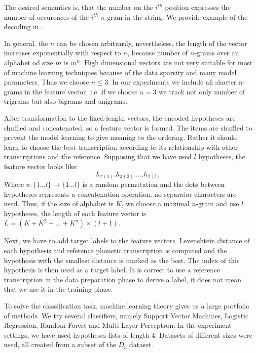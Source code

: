 The desired semantics is, that the number on the $i^{th}$ position expresses the number of occurences of the $i^{th}$ $n$-gram in the string.
We provide example of the decoding in .
\par
In general, the $n$ can be chosen arbitrarily, nevertheless, the length of the vector increases exponentially with respect to $n$, because number of $n$-grams over an alphabet od size $m$ is $m^n$.
High dimensional vectors are not very suitable for most of machine learning techniques because of the data sparsity and many model parameters.
Thus we choose $n \le 3$.
In our experiments we include all shorter n-grams in the feature vector, i.e. if we choose $n=3$ we track not only number of trigrams but also bigrams and unigrams.
\par
After transformation to the fixed-length vectors, the encoded hypotheses are shuffled and concatenated, so a feature vector is formed.
The items are shuffled to prevent the model learning to give meaning to the ordering.
Rather it should learn to choose the best transcription according to its relationship with other transcriptions and the reference.
Supposing that we have used $l$ hypotheses, the feature vector looks like:
$$h_{\pi(1)}.h_{\pi(2)}.\dots.h_{\pi(l)}$$
Where $\pi: \{1\dots l\} \rightarrow \{1\dots l\}$ is a random permutation and the dots between hypotheses represents a concatenation operation, no separator characters are used.
Thus, if the size of alphabet is $K$, we choose a maximal $n$-gram and use $l$ hypotheses, the length of each feature vector is $L = (K + K^2 + \dots + K^n) \times (l+1)$.
\par
Next, we have to add target labels to the feature vectors.
Levenshtein distance of each hypothesis and reference phonetic transcription is computed and the hypothesis with the smallest distance is marked as the best.
The index of this hypothesis is then used as a target label.
It is correct to use a reference transcription in the data preparation phase to derive a label, it does not mean that we use it in the training phase.
\par
To solve the classification task, machine learning theory gives us a large portfolio of methods.
We try several classifiers, namely Support Vector Machines, Logistic Regression, Random Forest and Multi Layer Perceptron.
In the experiment settings, we have used hypotheses lists of length 4.
Datasets of different sizes were used, all created from a subset of the $D_3$ dataset.
